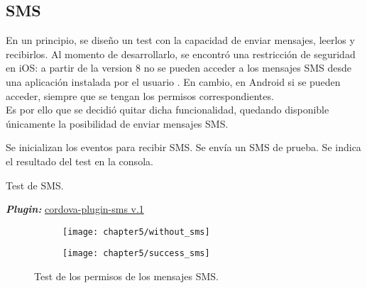 \subsection{SMS}
En un principio, se diseño un test con la capacidad de enviar mensajes, leerlos y recibirlos. Al momento de desarrollarlo, se encontró una restricción de seguridad en iOS: a partir de la version 8 no se pueden acceder a los mensajes SMS desde una aplicación instalada por el usuario \cite{foda, foda2}. En cambio, en Android si se pueden acceder, siempre que se tengan los permisos correspondientes.\\
Es por ello que se decidió quitar dicha funcionalidad, quedando disponible únicamente la posibilidad de enviar mensajes SMS.\\
\begin{algorithm}
	\begin{algorithmic}[1]
		\STATE Se inicializan los eventos para recibir SMS. 
		\STATE Se envía un SMS de prueba.
		\STATE Se indica el resultado del test en la consola.
	\end{algorithmic}
	\caption{Test de SMS.}\label{alg:chap5_test_sms}
\end{algorithm}
\textbf{\emph{Plugin:}} \href{https://github.com/floatinghotpot/cordova-plugin-sms}{cordova-plugin-sms v.1}
\begin{figure}[hbtp]
    \centering
	\begin{subfigure}{.3\linewidth}
		\texttt{[image: chapter5/without\_sms]}
		\label{fig:ch05:without_sms}
	\end{subfigure}
	\begin{subfigure}{.3\linewidth}
	    \centering
		\texttt{[image: chapter5/success\_sms]}
		\label{fig:ch05:with_sms}
	\end{subfigure}
	\caption{Test de los permisos de los mensajes SMS.}
	\label{fig:chapter05:sms_test}
\end{figure}
\newpage
